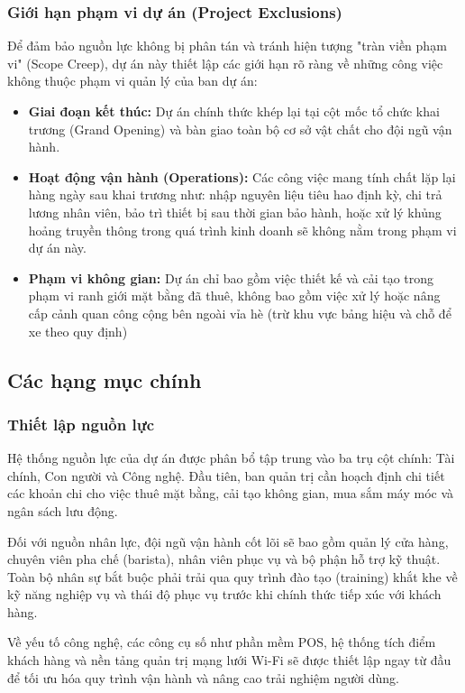\documentclass[a4paper,12pt]{article}
\begin{document}
\subsubsection{Giới hạn phạm vi dự án (Project Exclusions)}
Để đảm bảo nguồn lực không bị phân tán và tránh hiện tượng "tràn viền phạm vi" (Scope Creep), dự án này thiết lập các giới hạn rõ ràng về những công việc không thuộc phạm vi quản lý của ban dự án:
\begin{itemize}
    \item \textbf{Giai đoạn kết thúc: }Dự án chính thức khép lại tại cột mốc tổ chức khai trương (Grand Opening) và bàn giao toàn bộ cơ sở vật chất cho đội ngũ vận hành.
    \item \textbf{Hoạt động vận hành (Operations):} Các công việc mang tính chất lặp lại hàng ngày sau khai trương như: nhập nguyên liệu tiêu hao định kỳ, chi trả lương nhân viên, bảo trì thiết bị sau thời gian bảo hành, hoặc xử lý khủng hoảng truyền thông trong quá trình kinh doanh sẽ không nằm trong phạm vi dự án này.
    \item \textbf{Phạm vi không gian: }Dự án chỉ bao gồm việc thiết kế và cải tạo trong phạm vi ranh giới mặt bằng đã thuê, không bao gồm việc xử lý hoặc nâng cấp cảnh quan công cộng bên ngoài vỉa hè (trừ khu vực bảng hiệu và chỗ để xe theo quy định)
\end{itemize}

\subsection{Các hạng mục chính}
\subsubsection{Thiết lập nguồn lực}
Hệ thống nguồn lực của dự án được phân bổ tập trung vào ba trụ cột chính: Tài chính, Con người và Công nghệ. Đầu tiên, ban quản trị cần hoạch định chi tiết các khoản chi cho việc thuê mặt bằng, cải tạo không gian, mua sắm máy móc và ngân sách lưu động.

Đối với nguồn nhân lực, đội ngũ vận hành cốt lõi sẽ bao gồm quản lý cửa hàng, chuyên viên pha chế (barista), nhân viên phục vụ và bộ phận hỗ trợ kỹ thuật. Toàn bộ nhân sự bắt buộc phải trải qua quy trình đào tạo (training) khắt khe về kỹ năng nghiệp vụ và thái độ phục vụ trước khi chính thức tiếp xúc với khách hàng. 

Về yếu tố công nghệ, các công cụ số như phần mềm POS, hệ thống tích điểm khách hàng và nền tảng quản trị mạng lưới Wi-Fi sẽ được thiết lập ngay từ đầu để tối ưu hóa quy trình vận hành và nâng cao trải nghiệm người dùng.
\end{document}
